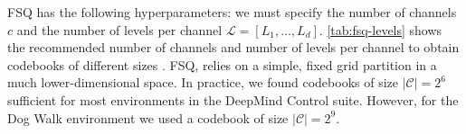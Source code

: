 \documentclass{article}
\makeatletter
\theoremstyle{plain}
\theoremstyle{definition}
\theoremstyle{remark}
\newcommand{\ie}{\textit{i.e.\@}\xspace}
\newcommand{\R}{\mathbb{R}}
\makeatother
\begin{document}
FSQ has the following hyperparameters: we must specify the number of channels $c$ and the number of levels per channel
$\mathcal{L} = [L_{1},\ldots,L_{d}]$.
\cref{tab:fsq-levels} shows the recommended number of channels and number of levels per channel to obtain codebooks of different sizes \citep{mentzerFiniteScalarQuantization2023}.
FSQ, relies on a simple, fixed grid partition in a much
lower-dimensional space.
In practice, we found codebooks of size $|\mathcal{C}|=2^{6}$ sufficient for most environments in the DeepMind Control suite.
However, for the Dog Walk environment we used a codebook of size $|\mathcal{C}|=2^{9}$.








\end{document}
